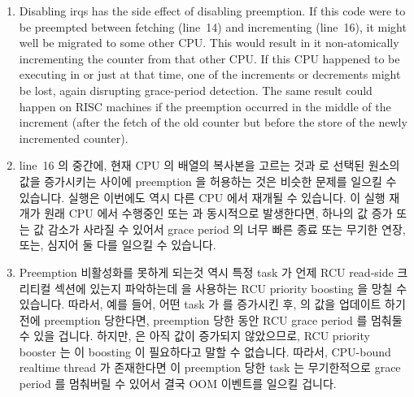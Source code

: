 \begin{enumerate}
\item	Disabling irqs has the side effect of disabling preemption.
	If this code were to be preempted between fetching
	 (line~14) and
	incrementing  (line~16),
	it might well be migrated to some other CPU.
	This would result in it non-atomically incrementing
	the counter from that other CPU.
	If this CPU happened to be executing in 
	or  just at that time, one
	of the increments or decrements might be lost, again
	disrupting grace-period detection.
	The same result could happen on RISC machines if the preemption
	occurred in the middle of the increment (after the fetch of
	the old counter but before the store of the newly incremented
	counter).
\fi
\item	line~16 의 중간에, 현재 CPU 의  배열의 복사본을 고르는
	것과  로 선택된 원소의 값을 증가시키는 사이에
	preemption 을 허용하는 것은 비슷한 문제를 일으킬 수 있습니다.
	실행은 이번에도 역시 다른 CPU 에서 재개될 수 있습니다.
	이 실행 재개가 원래 CPU 에서 수행중인  또는
	 과 동시적으로 발생한다면, 하나의 값 증가 또는 값
	감소가 사라질 수 있어서 grace period 의 너무 빠른 종료 또는 무기한
	연장, 또는, 심지어 둘 다를 일으킬 수 있습니다.

\item	Preemption 비활성화를 못하게 되는것 역시 특정 task 가 언제 RCU
	read-side 크리티컬 섹션에 있는지 파악하는데 
	을 사용하는 RCU priority boosting 을 망칠 수 있습니다.
	따라서, 예를 들어, 어떤 task 가  를 증가시킨 후,
	 의 값을 업데이트 하기 전에 preemption
	당한다면, preemption 당한 동안 RCU grace period 를 멈춰둘 수 있을
	겁니다.
	하지만,  은 아직 값이 증가되지 않았으므로,
	RCU priority booster 는 이 boosting 이 필요하다고 말할 수 없습니다.
	따라서, CPU-bound realtime thread 가 존재한다면 이 preemption 당한 task
	는 무기한적으로 grace period 를 멈춰버릴 수 있어서 결국 OOM 이벤트를
	일으킬 겁니다.
\iffalse


\end{enumerate}
